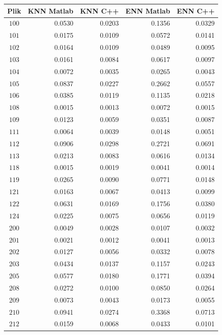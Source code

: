 \begin{table}[H]
	\centering
	\begin{tabular}{|c|r|r|r|r|}
		\hline
		Plik & KNN Matlab & KNN C++ & ENN Matlab & ENN C++  \\ 
\hline
$100$ & 0.0530 & 0.0203 & 0.1356 & 0.0329 \\
\hline
$101$ & 0.0175 & 0.0109 & 0.0572 & 0.0141 \\
\hline
$102$ & 0.0164 & 0.0109 & 0.0489 & 0.0095 \\
\hline
$103$ & 0.0161 & 0.0084 & 0.0617 & 0.0097 \\
\hline
$104$ & 0.0072 & 0.0035 & 0.0265 & 0.0043 \\
\hline
$105$ & 0.0837 & 0.0227 & 0.2662 & 0.0557 \\
\hline
$106$ & 0.0385 & 0.0119 & 0.1135 & 0.0218 \\
\hline
$108$ & 0.0015 & 0.0013 & 0.0072 & 0.0015 \\
\hline
$109$ & 0.0123 & 0.0059 & 0.0351 & 0.0087 \\
\hline
$111$ & 0.0064 & 0.0039 & 0.0148 & 0.0051 \\
\hline
$112$ & 0.0906 & 0.0298 & 0.2721 & 0.0691 \\
\hline
$113$ & 0.0213 & 0.0083 & 0.0616 & 0.0134 \\
\hline
$118$ & 0.0015 & 0.0019 & 0.0041 & 0.0014 \\
\hline
$119$ & 0.0265 & 0.0090 & 0.0771 & 0.0148 \\
\hline
$121$ & 0.0163 & 0.0067 & 0.0413 & 0.0099 \\
\hline
$122$ & 0.0631 & 0.0169 & 0.1756 & 0.0380 \\
\hline
$124$ & 0.0225 & 0.0075 & 0.0656 & 0.0119 \\
\hline
$200$ & 0.0049 & 0.0028 & 0.0107 & 0.0032 \\
\hline
$201$ & 0.0021 & 0.0012 & 0.0041 & 0.0013 \\
\hline
$202$ & 0.0127 & 0.0056 & 0.0332 & 0.0078 \\
\hline
$203$ & 0.0434 & 0.0137 & 0.1157 & 0.0243 \\
\hline
$205$ & 0.0577 & 0.0180 & 0.1771 & 0.0394 \\
\hline
$208$ & 0.0272 & 0.0100 & 0.0850 & 0.0264 \\
\hline
$209$ & 0.0073 & 0.0043 & 0.0173 & 0.0055 \\
\hline
$210$ & 0.0941 & 0.0274 & 0.3368 & 0.0713 \\
\hline
$212$ & 0.0159 & 0.0068 & 0.0433 & 0.0101 \\

\end{tabular}
\end{table}
